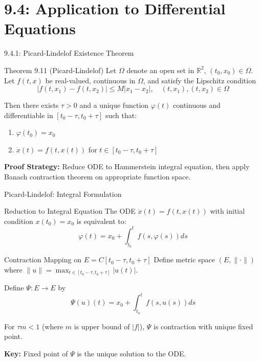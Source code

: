\documentclass[aspectratio=169,10pt]{beamer}
\begin{document}
\section{9.4: Application to Differential Equations}

\begin{frame}{9.4.1: Picard-Lindelof Existence Theorem}
    \begin{block}{Theorem 9.11 (Picard-Lindelof)}
        Let $\Omega$ denote an open set in $\mathbb{R}^2$, $(t_0, x_0) \in \Omega$. Let $f(t,x)$ be real-valued, continuous in $\Omega$, and satisfy the Lipschitz condition
        \[|f(t, x_1) - f(t, x_2)| \leq M|x_1 - x_2|, \quad (t,x_1), (t,x_2) \in \Omega\]

        Then there exists $\tau > 0$ and a unique function $\varphi(t)$ continuous and differentiable in $[t_0 - \tau, t_0 + \tau]$ such that:
        \begin{enumerate}
            \item $\varphi(t_0) = x_0$
            \item $\dot{x}(t) = f(t, x(t))$ for $t \in [t_0 - \tau, t_0 + \tau]$
        \end{enumerate}
    \end{block}

    \vspace{0.3cm}

    \textbf{Proof Strategy:} Reduce ODE to Hammerstein integral equation, then apply Banach contraction theorem on appropriate function space.
\end{frame}

\begin{frame}[fragile]{Picard-Lindelof: Integral Formulation}
    \begin{block}{Reduction to Integral Equation}
        The ODE $\dot{x}(t) = f(t, x(t))$ with initial condition $x(t_0) = x_0$ is equivalent to:
        \[\varphi(t) = x_0 + \int_{t_0}^t f(s, \varphi(s)) ds\]
    \end{block}

    \vspace{0.3cm}

    \begin{block}{Contraction Mapping on $E = C[t_0 - \tau, t_0 + \tau]$}
        Define metric space $(E, \|\cdot\|)$ where $\|u\| = \max_{t \in [t_0-\tau, t_0+\tau]} |u(t)|$.

        \smallskip

        Define $\Psi: E \to E$ by
        \[\Psi(u)(t) = x_0 + \int_{t_0}^t f(s, u(s)) ds\]

        \smallskip

        For $\tau m < 1$ (where $m$ is upper bound of $|f|$), $\Psi$ is contraction with unique fixed point.
    \end{block}

    \vspace{0.3cm}

    \textbf{Key:} Fixed point of $\Psi$ is the unique solution to the ODE.
\end{frame}
\end{document}
